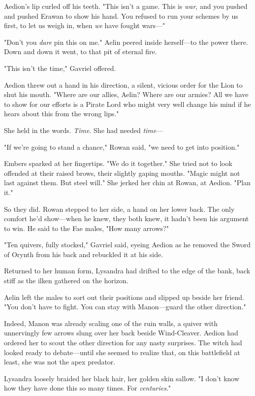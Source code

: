 Aedion's lip curled off his teeth.
"This isn't a game.
This is \emph{war}, and you pushed and pushed Erawan to show his hand.
You refused to run your schemes by us first, to let us weigh in, when \emph{we} have fought wars---"

"Don't you \emph{dare} pin this on me."
Aelin peered inside herself---to the power there.
Down and down it went, to that pit of eternal fire.

"This isn't the time," Gavriel offered.

Aedion threw out a hand in his direction, a silent, vicious order for the Lion to shut his mouth.
"Where are our allies, Aelin?
Where are our armies?
All we have to show for our efforts is a Pirate Lord who might very well change his mind if he hears about this from the wrong lips."

She held in the words.
\emph{Time}.
She had needed \emph{time}---

"If we're going to stand a chance," Rowan said, "we need to get into position."

Embers sparked at her fingertips.
"We do it together."
She tried not to look offended at their raised brows, their slightly gaping mouths.
"Magic might not last against them.
But steel will."
She jerked her chin at Rowan, at Aedion.
"Plan it."

So they did.
Rowan stepped to her side, a hand on her lower back.
The only comfort he'd show---when he knew, they both knew, it hadn't been his argument to win.
He said to the Fae males, "How many arrows?"

"Ten quivers, fully stocked," Gavriel said, eyeing Aedion as he removed the Sword of Orynth from his back and rebuckled it at his side.

Returned to her human form, Lysandra had drifted to the edge of the bank, back stiff as the ilken gathered on the horizon.

Aelin left the males to sort out their positions and slipped up beside her friend.
"You don't have to fight.
You can stay with Manon---guard the other direction."

Indeed, Manon was already scaling one of the ruin walls, a quiver with unnervingly few arrows slung over her back beside Wind-Cleaver.
Aedion had ordered her to scout the other direction for any nasty surprises.
The witch had looked ready to debate---until she seemed to realize that, on this battlefield at least, she was not the apex predator.

Lysandra loosely braided her black hair, her golden skin sallow.
"I don't know how they have done this so many times.
For \emph{centuries}."

